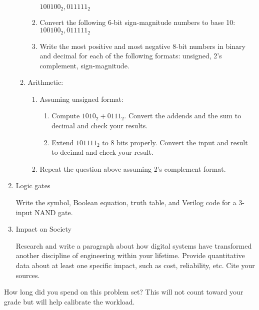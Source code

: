 \documentclass{ps}
\begin{document}
\begin{enumerate}
\begin{enumerate}
\begin{enumerate}
      \(100100_2, 011111_2\)
      \begin{solution}
      \end{solution}
    \item Convert the following 6-bit sign-magnitude numbers to base 10:\\
      \(100100_2, 011111_2\)
      \begin{solution}
      \end{solution}
    \item Write the most positive and most negative 8-bit numbers in
      binary and decimal for each of the following formats: unsigned,
      2's complement, sign-magnitude.
      \begin{solution}
      \end{solution}
    \end{enumerate}
  \item Arithmetic:
    \begin{enumerate}
    \item Assuming unsigned format:
      \begin{enumerate}
      \item Compute \(1010_2 + 0111_2\).  Convert the addends and the
        sum to decimal and check your results.
        \begin{solution}
        \end{solution}
      \item Extend \(101111_2\) to 8 bits properly.  Convert the input
        and result to decimal and check your result.
        \begin{solution}
        \end{solution}
      \end{enumerate}
    \item Repeat the question above assuming 2's complement format.
      \begin{solution}
      \end{solution}
    \end{enumerate}
  \end{enumerate}

\item Logic gates

  Write the symbol, Boolean equation, truth table, and Verilog code
  for a 3-input NAND gate.
  \begin{solution}
  \end{solution}

\item Impact on Society

  Research and write a paragraph about how digital systems have
  transformed another discipline of engineering within your lifetime.
  Provide quantitative data about at least one specific impact, such
  as cost, reliability, etc.  Cite your sources.
  \begin{solution}
  \end{solution}

\end{enumerate}

How long did you spend on this problem set?  This will not count
toward your grade but will help calibrate the workload.
\begin{solution}
\end{solution}
\end{document}
